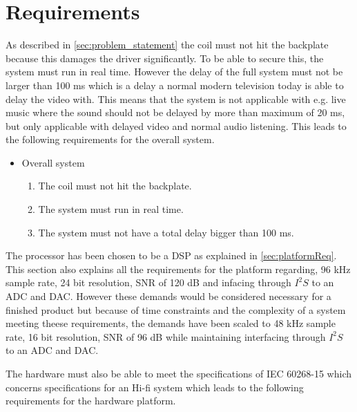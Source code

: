 \chapter{Requirements} \label{ch:requirements}
As described in \autoref{sec:problem_statement} the coil must not hit the backplate because this damages the driver significantly. To be able to secure this, the system must run in real time. However the delay of the full system must not be larger than 100 ms which is a delay  a normal modern television today is able to delay the video with. This means that the system is not applicable with e.g. live music where the sound should not be delayed by more than maximum of 20 ms, but only applicable with delayed video and normal audio listening. This leads to the following requirements for the overall system.

\begin{itemize}
\item Overall system
\begin{enumerate}
\item [\textlabel{1}{coil}] The coil must not hit the backplate.\\
\item [\textlabel{2}{realtime}] The system must run in real time. \\
\item [\textlabel{3}{delay}] The system must not have a total delay bigger than 100 ms.
\end{enumerate}
\end{itemize}

The processor has been chosen to be a DSP as explained in \autoref{sec:platformReq}. This section also explains all the requirements for the platform regarding, 96 kHz sample rate, 24 bit resolution, SNR of 120 dB and infacing through $I^2S$ to an ADC and DAC. However these demands would be considered necessary for a finished product but because of time constraints and the complexity of a system meeting theese requirements, the demands have been scaled to 48 kHz sample rate, 16 bit resolution, SNR of 96 dB while maintaining interfacing through $I^2S$ to an ADC and DAC. 

The hardware must also be able to meet the specifications of IEC 60268-15 which concerns specifications for an Hi-fi  system which leads to the following requirements for the hardware platform.

